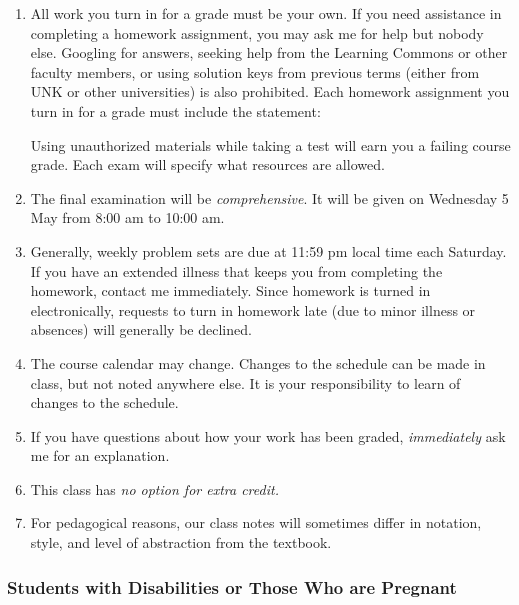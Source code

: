 \documentclass[12pt,fullpage]{article}
\newcounter{ex}\setcounter{ex}{0}
\begin{document}
\begin{enumerate}

\item All work you turn in for a grade must be your own.  If you need assistance in completing a homework assignment, you may ask me for help but nobody else. Googling for
answers, seeking help from the Learning Commons or other faculty members,  or using solution keys from previous terms (either from UNK or other universities) is also prohibited.  Each homework assignment you turn in for a grade must include the statement:

\begin{quote}
\end{quote}
Using unauthorized materials while taking a test will earn you a failing course grade. Each exam will specify what resources are allowed. 

 \item The final examination will be \emph{comprehensive}. It will be given on Wednesday 5 May from 8:00 am to 10:00 am.


 \item Generally, weekly problem sets are due at 11:59 pm local time each Saturday. If you have an extended illness that keeps you from completing the homework, contact me immediately. Since homework is turned in electronically, requests to 
turn in homework late (due to minor illness or absences) will generally be declined.


\item The course calendar may change. Changes to the schedule can be made in class, but 
not noted anywhere else. It is your responsibility to
learn of changes to the schedule.



\item If you have questions about how your work has been graded,  \emph{immediately}  ask me for an explanation.

\item This class has \emph{no option for extra credit.}


\item  For pedagogical reasons, our class notes will sometimes differ in notation, 
style, and level of abstraction from the textbook.


\end{enumerate}




\subsubsection*{Students with Disabilities or Those Who are Pregnant}
\end{document}
